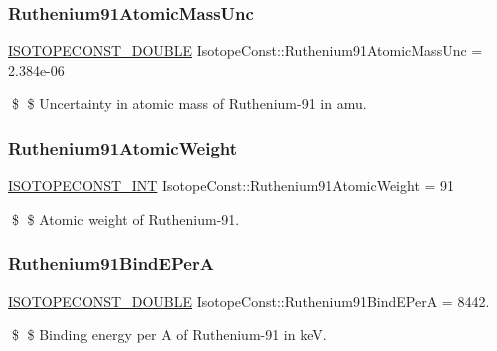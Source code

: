 \subsubsection{\texorpdfstring{Ruthenium91\+Atomic\+Mass\+Unc}{Ruthenium91AtomicMassUnc}}
{\footnotesize\ttfamily \mbox{\hyperlink{group___isotope_const-_macros_ga8f45a7272ce02c0b4c65c44636ed719a}{I\+S\+O\+T\+O\+P\+E\+C\+O\+N\+S\+T\+\_\+\+D\+O\+U\+B\+LE}} Isotope\+Const\+::\+Ruthenium91\+Atomic\+Mass\+Unc = 2.\+384e-\/06}

\$ \$ Uncertainty in atomic mass of Ruthenium-\/91 in amu. \mbox{\label{group___isotope_const-_ruthenium-_ru91_ga9b98a8b9ed4f1994cad0882c8cf04734}} 
\subsubsection{\texorpdfstring{Ruthenium91\+Atomic\+Weight}{Ruthenium91AtomicWeight}}
{\footnotesize\ttfamily \mbox{\hyperlink{group___isotope_const-_macros_ga5f18360b3e99483a35c32d789e62621c}{I\+S\+O\+T\+O\+P\+E\+C\+O\+N\+S\+T\+\_\+\+I\+NT}} Isotope\+Const\+::\+Ruthenium91\+Atomic\+Weight = 91}

\$ \$ Atomic weight of Ruthenium-\/91. \mbox{\label{group___isotope_const-_ruthenium-_ru91_ga612a3a6de3b406345c13777134a0e2b6}} 
\subsubsection{\texorpdfstring{Ruthenium91\+Bind\+E\+PerA}{Ruthenium91BindEPerA}}
{\footnotesize\ttfamily \mbox{\hyperlink{group___isotope_const-_macros_ga8f45a7272ce02c0b4c65c44636ed719a}{I\+S\+O\+T\+O\+P\+E\+C\+O\+N\+S\+T\+\_\+\+D\+O\+U\+B\+LE}} Isotope\+Const\+::\+Ruthenium91\+Bind\+E\+PerA = 8442.}

\$ \$ Binding energy per A of Ruthenium-\/91 in keV. \mbox{\label{group___isotope_const-_ruthenium-_ru91_gadd9899a6780f537f77d69b3ba7b1cf79}} 
